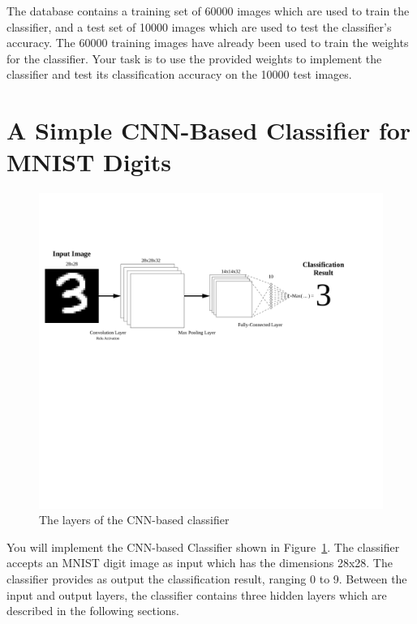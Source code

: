 \documentclass[epsfig,10pt,fullpage]{article}
\begin{document}
The database contains a training set of 60000 images which are used to train the classifier, and a test set of 10000 images which are used to test the classifier's accuracy. 
The 60000 training images have already been used to train the weights for the classifier. 
Your task is to use the provided weights to implement the classifier and test its classification accuracy on the 10000 test images.

\section*{A Simple CNN-Based Classifier for MNIST Digits}

\begin{figure}[H]
   \begin{center}
       \hspace*{0.1cm}\includegraphics[scale=0.6]{figures/fig_cnn_classifier}
   \end{center}
   \caption{The layers of the CNN-based classifier}
	\label{fig:cnn_classifier}
\end{figure}

You will implement the CNN-based Classifier shown in Figure~\ref{fig:cnn_classifier}. 
The classifier accepts an MNIST digit image as input which has the dimensions 28x28. 
The classifier provides as output the classification result, ranging 0 to 9.  
Between the input and output layers, the classifier contains three hidden layers which are described in the following sections.
\end{document}
